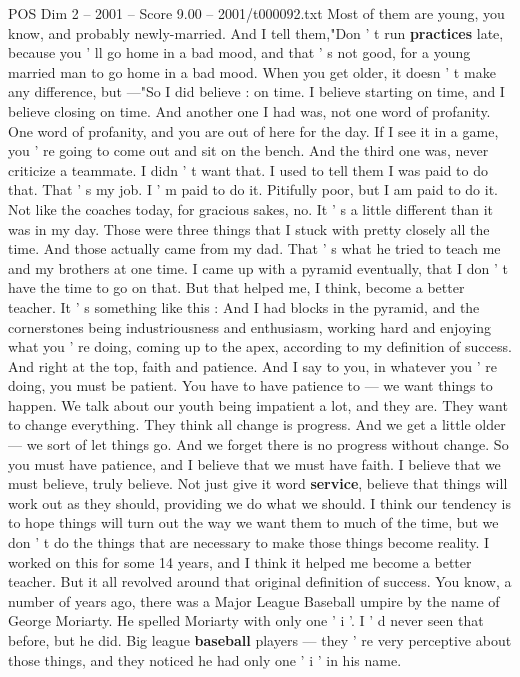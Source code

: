 \begin{textsample}{POS Dim 2 – 2001 – Score 9.00 – 2001/t000092.txt}
Most of them are young, you know, and probably newly-married.
And I tell them,"Don ' t run \textbf{practices} late, because you ' ll go home in a bad mood, and that ' s not good, for a young married man to go home in a bad mood.
When you get older, it doesn ' t make any difference, but —"So I did believe : on time.
I believe starting on time, and I believe closing on time.
And another one I had was, not one word of profanity.
One word of profanity, and you are out of here for the day.
If I see it in a game, you ' re going to come out and sit on the bench.
And the third one was, never criticize a teammate.
I didn ' t want that.
I used to tell them I was paid to do that.
That ' s my job.
I ' m paid to do it.
Pitifully poor, but I am paid to do it.
Not like the coaches today, for gracious sakes, no.
It ' s a little different than it was in my day.
Those were three things that I stuck with pretty closely all the time.
And those actually came from my dad.
That ' s what he tried to teach me and my brothers at one time.
I came up with a pyramid eventually, that I don ' t have the time to go on that.
But that helped me, I think, become a better teacher.
It ' s something like this : And I had blocks in the pyramid, and the cornerstones being industriousness and enthusiasm, working hard and enjoying what you ' re doing, coming up to the apex, according to my definition of success.
And right at the top, faith and patience.
And I say to you, in whatever you ' re doing, you must be patient.
You have to have patience to — we want things to happen.
We talk about our youth being impatient a lot, and they are.
They want to change everything.
They think all change is progress.
And we get a little older — we sort of let things go.
And we forget there is no progress without change.
So you must have patience, and I believe that we must have faith.
I believe that we must believe, truly believe.
Not just give it word \textbf{service}, believe that things will work out as they should, providing we do what we should.
I think our tendency is to hope things will turn out the way we want them to much of the time, but we don ' t do the things that are necessary to make those things become reality.
I worked on this for some 14 years, and I think it helped me become a better teacher.
But it all revolved around that original definition of success.
You know, a number of years ago, there was a Major League Baseball umpire by the name of George Moriarty.
He spelled Moriarty with only one ' i '.
I ' d never seen that before, but he did.
Big league \textbf{baseball} players — they ' re very perceptive about those things, and they noticed he had only one ' i ' in his name.

\end{textsample}
